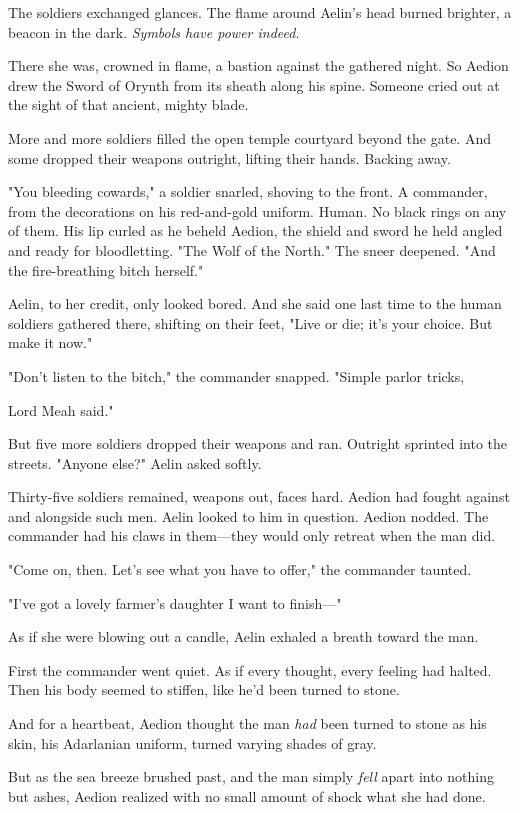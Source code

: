 The soldiers exchanged glances.
The flame around Aelin's head burned brighter, a beacon in the dark.
\emph{Symbols have power indeed}.

There she was, crowned in flame, a bastion against the gathered night.
So Aedion drew the Sword of Orynth from its sheath along his spine.
Someone cried out at the sight of that ancient, mighty blade.

More and more soldiers filled the open temple courtyard beyond the gate.
And some dropped their weapons outright, lifting their hands.
Backing away.

"You bleeding cowards," a soldier snarled, shoving to the front.
A commander, from the decorations on his red-and-gold uniform.
Human.
No black rings on any of them.
His lip curled as he beheld Aedion, the shield and sword he held angled and ready for bloodletting.
"The Wolf of the North."
The sneer deepened.
"And the fire-breathing bitch herself."

Aelin, to her credit, only looked bored.
And she said one last time to the human soldiers gathered there, shifting on their feet, "Live or die; it's your choice.
But make it now."

"Don't listen to the bitch," the commander snapped.
"Simple parlor tricks,

Lord Meah said."

But five more soldiers dropped their weapons and ran.
Outright sprinted into the streets.
"Anyone else?"
Aelin asked softly.

Thirty-five soldiers remained, weapons out, faces hard.
Aedion had fought against and alongside such men.
Aelin looked to him in question.
Aedion nodded.
The commander had his claws in them---they would only retreat when the man did.

"Come on, then.
Let's see what you have to offer," the commander taunted.

"I've got a lovely farmer's daughter I want to finish---"

As if she were blowing out a candle, Aelin exhaled a breath toward the man.

First the commander went quiet.
As if every thought, every feeling had halted.
Then his body seemed to stiffen, like he'd been turned to stone.

And for a heartbeat, Aedion thought the man \emph{had} been turned to stone as his skin, his Adarlanian uniform, turned varying shades of gray.

But as the sea breeze brushed past, and the man simply \emph{fell} apart into nothing but ashes, Aedion realized with no small amount of shock what she had done.

